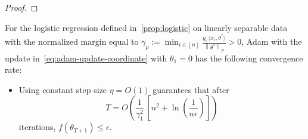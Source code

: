 \documentclass{article}
\newcommand{\norm}[1]{\left\|#1 \right\|}
\begin{document}
\begin{proof}
\end{proof}


\begin{theorem}
For the logistic regression defined in~\cref{prop:logistic} on linearly separable data with the normalized margin equal to $\gamma_p := \min_{i\in [n]} \frac{y_i \, \langle x_i, \theta^* \rangle}{\norm{\theta^*}_p} > 0$, Adam with the update in~\cref{eq:adam-update-coordinate} with $\theta_1 = 0$ has the following convergence rate:   
\begin{itemize}
    \item Using constant step size $\eta  = O(1)$ guarantees that after 
    \[
T = O\left( \frac{1}{\gamma_1^2} \, \left[n^2 + \ln\left(\frac{1}{n \epsilon}\right)\right]\right)
\]
iterations, 
    $f(\theta_{T+1}) \leq \epsilon$. 
\end{itemize}
\label{thm:adam-logreg}
\end{theorem}
\end{document}
